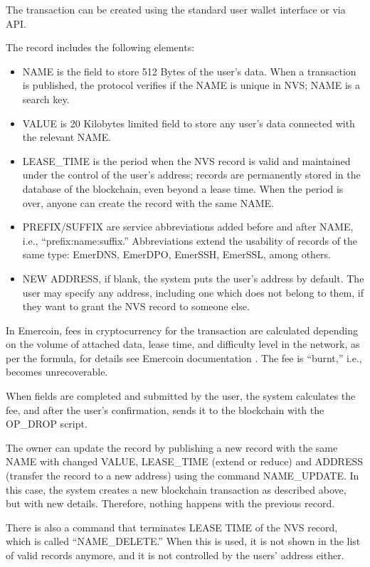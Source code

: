 \begin{multicols}{2}
The transaction can be created using the standard user wallet interface or via API.

The record includes the following elements:
\begin{itemize}
\item NAME is the field to store 512 Bytes of the user’s data. When a transaction is published, the protocol verifies if the NAME is unique in NVS; NAME is a search key.
\item VALUE is 20 Kilobytes limited field to store any user’s data connected with the relevant NAME.
\item LEASE\_TIME is the period when the NVS record is valid and maintained under the control of the user’s address; records are permanently stored in the database of the blockchain, even beyond a lease time. When the period is over, anyone can create the record with the same NAME.
\item PREFIX/SUFFIX are service abbreviations added before and after NAME, i.e., “prefix:name:suffix.” Abbreviations extend the usability of records of the same type: EmerDNS, EmerDPO, EmerSSH, EmerSSL, among others.
\item NEW ADDRESS, if blank, the system puts the user’s address by default. The user may specify any address, including one which does not belong to them, if they want to grant the NVS record to someone else.
\end{itemize}

In Emercoin, fees in cryptocurrency for the transaction are calculated depending on the volume of attached data, lease time, and difficulty level in the network, as per the formula, for details see Emercoin documentation \cite{art1-key52}. The fee is “burnt,” i.e., becomes unrecoverable.

When fields are completed and submitted by the user, the system calculates the fee, and after the user’s confirmation, sends it to the blockchain with the OP\_DROP script.

The owner can update the record by publishing a new record with the same NAME with changed VALUE, LEASE\_TIME (extend or reduce) and ADDRESS (transfer the record to a new address) using the command NAME\_UPDATE. In this case, the system creates a new blockchain transaction as described above, but with new details. Therefore, nothing happens with the previous record.

There is also a command that terminates LEASE TIME of the NVS record, which is called “NAME\_DELETE.” When this is used, it is not shown in the list of valid records anymore, and it is not controlled by the users’ address either.


\end{multicols}
